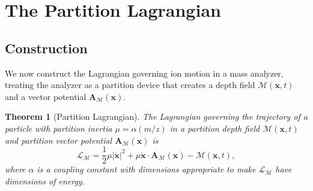 \documentclass[11pt,twocolumn,a4paper]{article}
\newtheorem{theorem}{Theorem}[section]
\theoremstyle{definition}
\theoremstyle{remark}
\newcommand{\Depth}{\mathcal{M}}
\newcommand{\partinert}{\mu}
\newcommand{\Apartition}{\mathbf{A}_{\mathcal{M}}}
\newcommand{\Lagr}{\mathcal{L}}
\begin{document}
\section{The Partition Lagrangian}
\label{sec:partition-lagrangian}

\subsection{Construction}
\label{sec:lagrangian-construction}

We now construct the Lagrangian governing ion motion in a mass analyzer, treating the analyzer as a partition device that creates a depth field $\Depth(\mathbf{x}, t)$ and a vector potential $\Apartition(\mathbf{x})$.

\begin{theorem}[Partition Lagrangian]
\label{thm:partition-lagrangian}
The Lagrangian governing the trajectory of a particle with partition inertia $\partinert = \alpha(m/z)$ in a partition depth field $\Depth(\mathbf{x}, t)$ and partition vector potential $\Apartition(\mathbf{x})$ is
\begin{equation}
\label{eq:partition-lagrangian}
  \Lagr_\Depth = \frac{1}{2}\partinert |\dot{\mathbf{x}}|^2 + \partinert \dot{\mathbf{x}} \cdot \Apartition(\mathbf{x}) - \Depth(\mathbf{x}, t),
\end{equation}
where $\alpha$ is a coupling constant with dimensions appropriate to make $\Lagr_\Depth$ have dimensions of energy.
\end{theorem}
\end{document}
